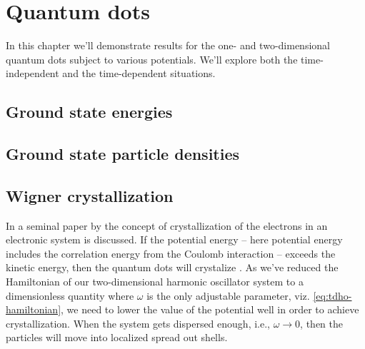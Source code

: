 \chapter{Quantum dots}
    In this chapter we'll demonstrate results for the one- and
    two-dimensional quantum dots subject to various potentials.
    We'll explore both the time-independent and the time-dependent situations.

    \section{Ground state energies}

    \section{Ground state particle densities}

    \section{Wigner crystallization}
        In a seminal paper by \citeauthor{wigner-crystal}
        \cite{wigner-crystal} the concept of crystallization of the electrons in
        an electronic system is discussed.
        If the potential energy -- here potential energy includes the
        correlation energy from the Coulomb interaction -- exceeds the kinetic
        energy, then the quantum dots will crystalize
        \cite{Cavaliere_2009, zeng-wigner, constantine-wigner, Mikhailov2002,
        akman1999277, hogberget2013quantum}.
        As we've reduced the Hamiltonian of our two-dimensional harmonic
        oscillator system to a dimensionless quantity where $\omega$ is the only
        adjustable parameter, viz. \autoref{eq:tdho-hamiltonian}, we need to
        lower the value of the potential well in order to achieve
        crystallization.
        When the system gets dispersed enough, i.e., $\omega \to 0$, then the
        particles will move into localized spread out shells.

